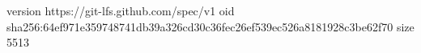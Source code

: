 version https://git-lfs.github.com/spec/v1
oid sha256:64ef971e359748741db39a326cd30c36fec26ef539ec526a8181928c3be62f70
size 5513
